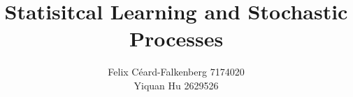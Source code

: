 \documentclass{report}
\title{Statisitcal Learning and Stochastic Processes}
\author{Felix Céard-Falkenberg 7174020
\\
Yiquan Hu 2629526}
\begin{document}
\tableofcontents
\newpage




\pagebreak







\end{document}
